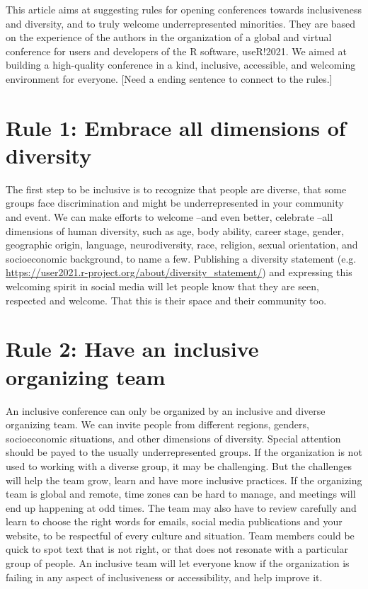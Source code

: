 \documentclass[10pt,letterpaper]{article}
\begin{document}
This article aims at suggesting rules for opening conferences towards inclusiveness and diversity, and to truly welcome underrepresented minorities. They are based on the experience of the authors in the organization of a global and virtual conference for users and developers of the R software, useR!2021. We aimed at building a high-quality conference in a kind, inclusive, accessible, and welcoming environment for everyone. [Need a ending sentence to connect to the rules.]

\section*{Rule 1: Embrace all dimensions of diversity}
The first step to be inclusive is to recognize that people are diverse, that some groups face discrimination and might be underrepresented in your community and event. We can make efforts to welcome --and even better, celebrate --all dimensions of human diversity, such as age, body ability, career stage, gender, geographic origin, language, neurodiversity, race, religion, sexual orientation, and socioeconomic background, to name a few. Publishing a diversity statement (e.g. \url{https://user2021.r-project.org/about/diversity_statement/}) and expressing this welcoming spirit in social media will let people know that they are seen, respected and welcome. That this is their space and their community too. 

\section*{Rule 2: Have an inclusive organizing team}
An inclusive conference can only be organized by an inclusive and diverse organizing team. We can invite people from different regions, genders, socioeconomic situations, and other dimensions of diversity. Special attention should be payed to the usually underrepresented groups. If the organization is not used to working with a diverse group, it may be challenging. But the challenges will help the team grow, learn and have more inclusive practices. If the organizing team is global and remote, time zones can be hard to manage, and meetings will end up happening at odd times. The team may also have to review carefully and learn to choose the right words for emails,
social media publications and your website, to be respectful of every culture and situation. 
Team members could be quick to spot text that is not right, or that does not resonate with a particular group of people. An inclusive team will let everyone know if the organization is failing in any aspect of inclusiveness or accessibility, and help improve it.
\end{document}
